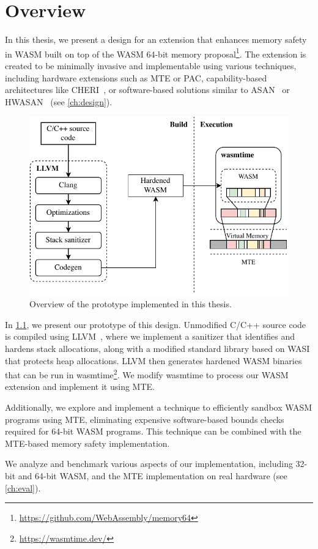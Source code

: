 \chapter{Overview}
\label{ch:overview}

In this thesis, we present a design for an extension that enhances memory safety in \ac{WASM} built on top of the \ac{WASM} 64-bit memory proposal\footnote{\url{https://github.com/WebAssembly/memory64}}.
The extension is created to be minimally invasive and implementable using various techniques, including hardware extensions such as \ac{MTE} or \ac{PAC}, capability-based architectures like \ac{CHERI}~\cite{woodruff2014cheri}, or software-based solutions similar to \ac{ASAN}~\cite{serebryany2012addresssanitizer} or \ac{HWASAN}~\cite{serebryany2018memory} (see \cref{ch:design}).


\begin{figure}[ht]
    \centering
    \includegraphics{figures/build/overview-simple}
    \caption{Overview of the prototype implemented in this thesis.}
    \label{fig:system-overview}
\end{figure}

In \cref{fig:system-overview}, we present our prototype of this design.
Unmodified C/C++ source code is compiled using LLVM~\cite{lattner2004llvm}, where we implement a sanitizer that identifies and hardens stack allocations, along with a modified standard library based on \ac{WASI} that protects heap allocations.
LLVM then generates hardened \ac{WASM} binaries that can be run in wasmtime\footnote{\url{https://wasmtime.dev/}}.
We modify wasmtime to process our \ac{WASM} extension and implement it using \ac{MTE}.

Additionally, we explore and implement a technique to efficiently sandbox \ac{WASM} programs using \ac{MTE}, eliminating expensive software-based bounds checks required for 64-bit \ac{WASM} programs.
This technique can be combined with the \ac{MTE}-based memory safety implementation.

We analyze and benchmark various aspects of our implementation, including 32-bit and 64-bit \ac{WASM}, and the \ac{MTE} implementation on real hardware (see \cref{ch:eval}).
